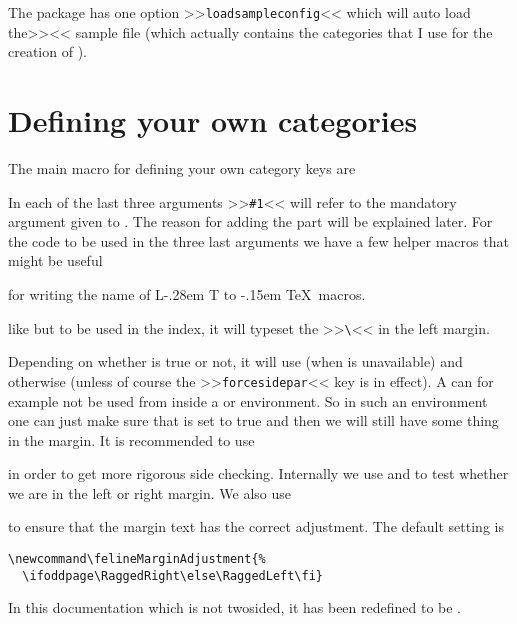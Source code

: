 \documentclass[11pt,oneside,a4paper,oldfontcommands,danish,english,article]{memoir}
\makeatletter
\DeclareRobustCommand{\LaTeX}{L\kern-.28em%
        {\sbox\z@ T%
         \vbox to\ht\z@{\hbox{\check@mathfonts
                              \fontsize\sf@size\z@
                              \math@fontsfalse\selectfont
                              A}%
                        \vss}%
        }%
        \kern-.15em%
        \TeX}
\renewcommand\felineMarginAdjustment{\RaggedLeft}
\makeatother
\begin{document}
\endgroup
\noindent
The package has one option >>\texttt{loadsampleconfig}<< which
will auto load the\linebreak >><< sample file (which
actually contains the categories that I use for the creation of
\cite{ltxb}). 


\section{Defining your own categories}
\label{sec:defining-your-own}

The main macro for defining your own category keys are
\begin{syntax*}
\end{syntax*}
In each of the last three arguments >>\texttt{\#1}<< will refer to the
mandatory argument given to . The reason for
adding the  part will be explained later. For the
code to be used in the three last arguments we have a few helper
macros that might be useful
\begin{syntax}
\end{syntax}
for writing the name of \LaTeX\ macros.
\begin{syntax}
\end{syntax}
like  but to be used in the index, it will typeset
the >>\verb+\+<< in the left margin.
\begin{syntax}
\end{syntax}
Depending on whether  is true or not,
it will use  (when  is
unavailable) and  otherwise (unless of course the
>>\texttt{forcesidepar}<< key is in effect). A
 can for example not be used from inside a
 or  environment. So
in such an environment one can just make sure that
 is set to true and then we will still
have some thing in the margin. It is recommended to use 
\begin{syntax}
\end{syntax}
in order to get more rigorous side checking. Internally we use
 and  to test whether
we are in the left or right margin. We also use
\begin{syntax}
\end{syntax}
to ensure that the margin text has the correct adjustment. The default
setting is
\begin{verbatim}
\newcommand\felineMarginAdjustment{%
  \ifoddpage\RaggedRight\else\RaggedLeft\fi}
\end{verbatim}
In this documentation which is not twosided, it has been redefined to
be .
\end{document}
